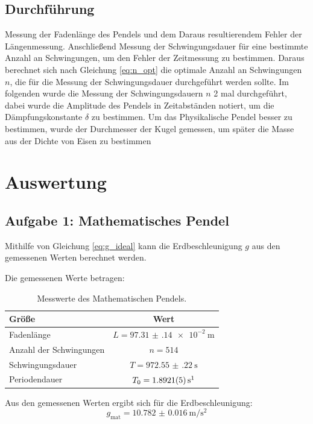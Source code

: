 \documentclass[12pt,a4paper,titlepage]{scrartcl}
\numberwithin{equation}{section}
\numberwithin{table}{section}
\numberwithin{figure}{section}
\begin{document}
\subsection{Durchführung}
Messung der Fadenlänge des Pendels und dem Daraus resultierendem Fehler der Längenmessung. Anschließend Messung der Schwingungsdauer für eine bestimmte Anzahl an Schwingungen, um den Fehler der Zeitmessung zu bestimmen. 
Daraus berechnet sich nach Gleichung \eqref{eq:n_opt} die optimale Anzahl an Schwingungen $n$, die für die Messung der Schwingungsdauer durchgeführt werden sollte.
Im folgenden wurde die Messung der Schwingungsdauern $n$ 2 mal durchgeführt, dabei wurde die Amplitude des Pendels in Zeitabständen notiert, um die Dämpfungskonstante $\delta$ zu bestimmen. Um das Physikalische Pendel besser zu bestimmen, wurde der Durchmesser der Kugel gemessen, um später die Masse aus der Dichte von Eisen zu bestimmen


\section{Auswertung}

\subsection{Aufgabe 1: Mathematisches Pendel}
Mithilfe von Gleichung \ref{eq:g_ideal} kann die Erdbeschleunigung $g$ aus den gemessenen Werten berechnet werden.

Die gemessenen Werte betragen: 
\begin{table}[H]
    \centering
    \caption{Messwerte des Mathematischen Pendels.}
    \begin{tabular}{lc}
        \toprule
        \textbf{Größe} & \textbf{Wert} \\
        \midrule
        Fadenlänge & $L = \qty{97.31(14)e-2}{\meter}$ \\
        Anzahl der Schwingungen & $n = 514$ \\
        Schwingungsdauer & $T = \qty{972.55(22)}{\second}$ \\
        Periodendauer & $T_0 = \qty{1.8921(5)}{\second}\footnotemark$ \\
        \bottomrule
    \end{tabular}
\end{table}

Aus den gemessenen Werten ergibt sich für die Erdbeschleunigung:
\begin{equation}
    g_\text{mat} = \qty{10.782(16)}{\meter\per\second\squared}
\end{equation}
\end{document}
